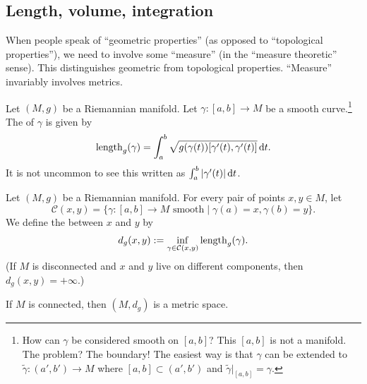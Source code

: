 
\lecture[]

\subsection{Length, volume, integration}

\begin{node}
When people speak of ``geometric properties'' (as opposed to
``topological properties''), we need to involve some ``measure'' (in
the ``measure theoretic'' sense). This
distinguishes geometric from topological properties. ``Measure''
invariably involves metrics.
\end{node}

\begin{definition}
Let $(M,g)$ be a Riemannian manifold. Let $\gamma\colon[a,b]\to M$ be
a smooth curve.\footnote{How can $\gamma$ be considered smooth on
$[a,b]$? This $[a,b]$ is not a manifold. The problem? The boundary!
The easiest way is that $\gamma$ can be extended to
$\widetilde{\gamma}\colon(a',b')\to M$ where $[a,b]\subset(a',b')$ and $\widetilde{\gamma}|_{[a,b]}=\gamma$.}
The  of $\gamma$ is given by
\begin{equation}
\operatorname{length}_{g}(\gamma)=\int^{b}_{a}\sqrt{g(\gamma(t))[\gamma'(t),\gamma'(t)]}\,\mathrm{d} t.
\end{equation}
It is not uncommon to see this written as
$\int^{b}_{a}|\gamma'(t)|\,\mathrm{d} t$.
\end{definition}

\begin{definition}
Let $(M,g)$ be a Riemannian manifold. For every pair of points $x,y\in M$,
let
\begin{equation}
\mathcal{C}(x,y)=\{\gamma\colon[a,b]\to M\mbox{ smooth}\mid\gamma(a)=x,\gamma(b)=y\}.
\end{equation}
We define the  between $x$ and $y$ by
\begin{equation}
d_{g}(x,y):=\inf_{\gamma\in\mathcal{C}(x,y)}\operatorname{length}_{g}(\gamma).
\end{equation}
(If $M$ is disconnected and $x$ and $y$ live on different components,
then $d_{g}(x,y)=+\infty$.)
\end{definition}

\begin{proposition}
If $M$ is connected, then $(M,d_{g})$ is a metric space.
\end{proposition}

